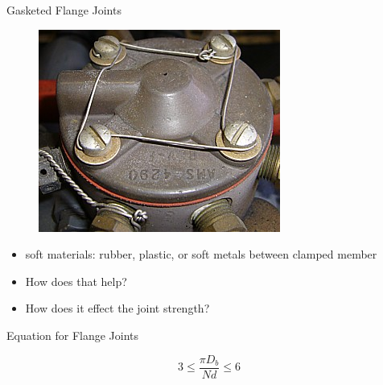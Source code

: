 \documentclass[10pt, svgnames]{beamer}
\begin{document}
\begin{frame}[label={sec:orgc3dcc31}]{Gasketed Flange Joints}
\begin{figure}[h]
  \includegraphics[height=0.4\textheight]{pictures/gasket-joint}
\end{figure}
\begin{itemize}
\item soft materials: rubber, plastic, or soft metals between clamped member
\item How does that help?
\item How does it effect the joint strength?
\end{itemize}
\end{frame}

\begin{frame}[label={sec:orgb314297}]{Equation for Flange Joints}
\centering
{}
$$ 3 \leqslant \frac{\pi D_b}{Nd} \leqslant 6 $$
\end{frame}
\end{document}
